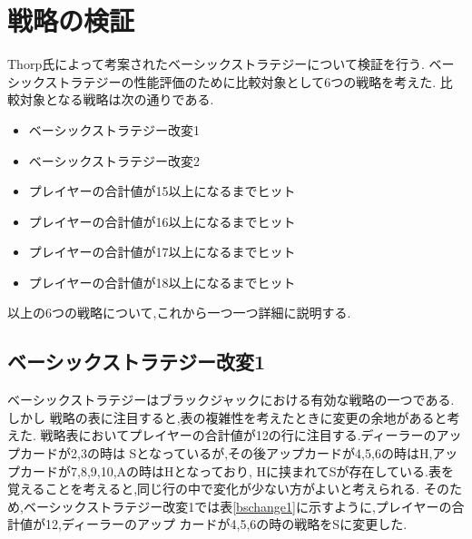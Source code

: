 \section{戦略の検証}

Thorp氏によって考案されたベーシックストラテジーについて検証を行う.
ベーシックストラテジーの性能評価のために比較対象として6つの戦略を考えた.
比較対象となる戦略は次の通りである.

\begin{itemize}
  \item ベーシックストラテジー改変1
  \item ベーシックストラテジー改変2
  \item プレイヤーの合計値が15以上になるまでヒット
  \item プレイヤーの合計値が16以上になるまでヒット
  \item プレイヤーの合計値が17以上になるまでヒット
  \item プレイヤーの合計値が18以上になるまでヒット
\end{itemize}

以上の6つの戦略について,これから一つ一つ詳細に説明する.

\subsection{ベーシックストラテジー改変1}
ベーシックストラテジーはブラックジャックにおける有効な戦略の一つである.しかし
戦略の表に注目すると,表の複雑性を考えたときに変更の余地があると考えた.
戦略表においてプレイヤーの合計値が12の行に注目する.ディーラーのアップカードが2,3の時は
Sとなっているが,その後アップカードが4,5,6の時はH,アップカードが7,8,9,10,Aの時はHとなっており,
Hに挟まれてSが存在している.表を覚えることを考えると,同じ行の中で変化が少ない方がよいと考えられる.
そのため,ベーシックストラテジー改変1では表\ref{bschange1}に示すように,プレイヤーの合計値が12,ディーラーのアップ
カードが4,5,6の時の戦略をSに変更した.

